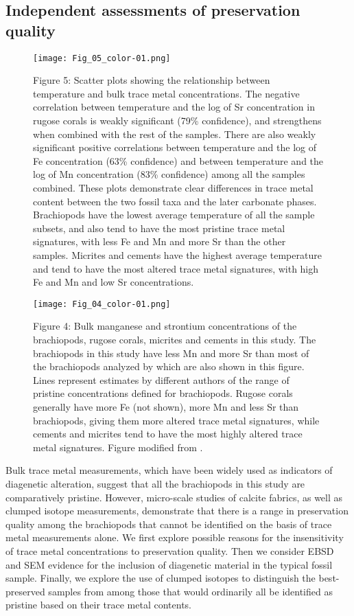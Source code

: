 \documentclass[5p, authoryear]{elsarticle}
\begin{document}
\subsection{Independent assessments of preservation quality}

\begin{figure*}[b]
\centering
\texttt{[image: Fig\_05\_color-01.png]}
\captionsetup{labelformat=empty} 
\caption{Figure 5: Scatter plots showing the relationship between temperature and bulk trace metal concentrations. The negative correlation between temperature and the log of Sr concentration in rugose corals is weakly significant (79\% confidence), and strengthens when combined with the rest of the samples. There are also weakly significant positive correlations between temperature and the log of Fe concentration (63\% confidence) and between temperature and the log of Mn concentration (83\% confidence) among all the samples combined. These plots demonstrate clear differences in trace metal content between the two fossil taxa and the later carbonate phases. Brachiopods have the lowest average temperature of all the sample subsets, and also tend to have the most pristine trace metal signatures, with less Fe and Mn and more Sr than the other samples. Micrites and cements have the highest average temperature and tend to have the most altered trace metal signatures, with high Fe and Mn and low Sr concentrations.}
\label{Brand}
\end{figure*}

\begin{figure}[t]
\centering
\texttt{[image: Fig\_04\_color-01.png]}
\captionsetup{labelformat=empty} 
\caption{Figure 4: Bulk manganese and strontium concentrations of the brachiopods, rugose corals, micrites and cements in this study. The brachiopods in this study have less Mn and more Sr than most of the brachiopods analyzed by \cite{Brand2012} which are also shown in this figure. Lines represent estimates by different authors of the range of pristine concentrations defined for brachiopods. Rugose corals generally have more Fe (not shown), more Mn and less Sr than brachiopods, giving them more altered trace metal signatures, while cements and micrites tend to have the most highly altered trace metal signatures. Figure modified from \cite{Brand2012}.}
\label{metals}
\end{figure}

Bulk trace metal measurements, which have been widely used as indicators of diagenetic alteration, suggest that all the brachiopods in this study are comparatively pristine. However, micro-scale studies of calcite fabrics, as well as clumped isotope measurements, demonstrate that there is a range in preservation quality among the brachiopods that cannot be identified on the basis of trace metal measurements alone. We first explore possible reasons for the insensitivity of trace metal concentrations to preservation quality. Then we consider EBSD and SEM evidence for the inclusion of diagenetic material in the typical fossil sample. Finally, we explore the use of clumped isotopes to distinguish the best-preserved samples from among those that would ordinarily all be identified as pristine based on their trace metal contents.  
\end{document}
